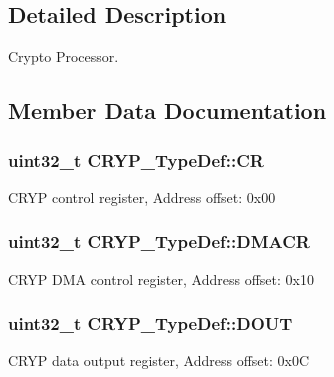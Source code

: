 \subsection{Detailed Description}
Crypto Processor. 

\subsection{Member Data Documentation}
\subsubsection[{\texorpdfstring{CR}{CR}}]{ uint32\+\_\+t C\+R\+Y\+P\+\_\+\+Type\+Def\+::\+CR}\hypertarget{struct_c_r_y_p___type_def_a65da2a40a06c5c391cbe346dbaa5380c}{}\label{struct_c_r_y_p___type_def_a65da2a40a06c5c391cbe346dbaa5380c}
C\+R\+YP control register, Address offset\+: 0x00 
\subsubsection[{\texorpdfstring{D\+M\+A\+CR}{DMACR}}]{ uint32\+\_\+t C\+R\+Y\+P\+\_\+\+Type\+Def\+::\+D\+M\+A\+CR}\hypertarget{struct_c_r_y_p___type_def_ad525241894427fc83a16e3370bb5b1d8}{}\label{struct_c_r_y_p___type_def_ad525241894427fc83a16e3370bb5b1d8}
C\+R\+YP D\+MA control register, Address offset\+: 0x10 
\subsubsection[{\texorpdfstring{D\+O\+UT}{DOUT}}]{ uint32\+\_\+t C\+R\+Y\+P\+\_\+\+Type\+Def\+::\+D\+O\+UT}\hypertarget{struct_c_r_y_p___type_def_a0b3e1f1551d11a01f7b2356e91281e7d}{}\label{struct_c_r_y_p___type_def_a0b3e1f1551d11a01f7b2356e91281e7d}
C\+R\+YP data output register, Address offset\+: 0x0C 
